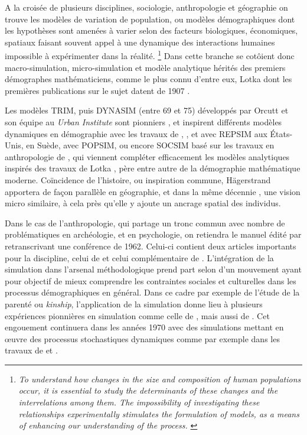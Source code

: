 A la croisée de plusieurs disciplines, sociologie, anthropologie et géographie on trouve les modèles de variation de population, ou modèles démographiques dont les hypothèses sont amenées à varier selon des facteurs biologiques, économiques, spatiaux faisant souvent appel à une dynamique des interactions humaines impossible à expérimenter dans la réalité. \footnote {\textit{To understand how changes in the size and composition of human populations occur, it is essential to study the determinants of these changes and the interrelations among them. The impossibility of investigating these relationships experimentally stimulates the formulation of models, as a means of enhancing our understanding of the process.} \autocite{Sheps1971}} Dans cette branche se cotôient donc macro-simulation, micro-simulation et modèle analytique hérités des premiers démographes mathématiciens, comme le plus connu d'entre eux, Lotka dont les premières publications sur le sujet datent de 1907 \autocite[355]{Veron2009}.

Les modèles TRIM, puis DYNASIM (entre 69 et 75) développés par Orcutt et son équipe au \textit{Urban Institute} sont pionniers \autocite{Orcutt1957, Orcutt1960, Orcutt1976}, et inspirent différents modèles dynamiques en démographie avec les travaux de \autocite{Perrin1964}, \textcite{Sheps1971}, et \textcite{Ridley1966} avec REPSIM aux États-Unis,  \textcite{Hyrenius1964} en Suède, \textcite{Horvitz1971} avec POPSIM, ou encore SOCSIM basé sur les travaux en anthropologie de \textcite{Gilbert1966}, qui viennent compléter efficacement les modèles analytiques inspirés des travaux de Lotka \autocite{Sheps1971}, père entre autre de la démographie mathématique moderne. Coïncidence de l'histoire, ou inspiration commune, Hägerstrand apportera de façon parallèle en géographie, et dans la même décennie \autocite{Hagerstrand1952, Hagerstrand1967}, une vision micro similaire, à cela près qu'elle y ajoute un ancrage spatial des individus.

Dans le cas de l'anthropologie, qui partage un tronc commun avec nombre de problématiques en archéologie, et en psychologie, on retiendra le manuel édité par \textcite{Hymes1965} retranscrivant une conférence de 1962. Celui-ci contient deux articles importants pour la discipline, celui de \textcite{Gullahorn1965} et celui complémentaire de \textcite{Hays1965}. L'intégration de la simulation dans l'arsenal méthodologique prend part selon \textcite[274]{Bentley2009} d'un mouvement ayant pour objectif de mieux comprendre les contraintes sociales et culturelles dans les processus démographiques en général. Dans ce cadre par exemple de l'étude de la parenté ou \textit{kinship}, l'application de la simulation donne lieu à plusieurs expériences pionnières \autocite{Dyke1981} en simulation comme celle de \textcite{Kunstadter1963}, mais aussi de \textcite{Gilbert1966}. Cet engouement continuera dans les années 1970 \autocite{Read1999} avec des simulations mettant en œuvre des processus stochastiques dynamiques comme par exemple dans les travaux de \textcite{Howell1978} et \textcite{Thomas1973}.

